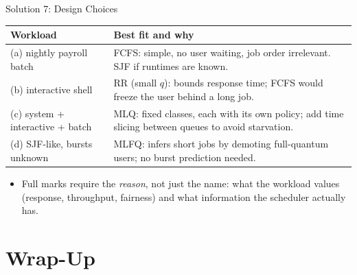 \documentclass[aspectratio=169]{beamer}
\begin{document}
\begin{frame}{Solution 7: Design Choices}
  \centering
  \footnotesize
  \renewcommand{\arraystretch}{1.35}
  \begin{tabular}{p{5.6cm}p{6.2cm}}
    \toprule
    \textbf{Workload} & \textbf{Best fit and why} \\
    \midrule
    (a) nightly payroll batch & FCFS: simple, no user waiting, job order
      irrelevant. SJF if runtimes are known. \\
    (b) interactive shell & RR (small $q$): bounds response time; FCFS would
      freeze the user behind a long job. \\
    (c) system + interactive + batch & MLQ: fixed classes, each with its own
      policy; add time slicing between queues to avoid starvation. \\
    (d) SJF-like, bursts unknown & MLFQ: infers short jobs by demoting
      full-quantum users; no burst prediction needed. \\
    \bottomrule
  \end{tabular}
  \vspace{0.25cm}
  \begin{itemize}
    \item Full marks require the \emph{reason}, not just the name: what the
      workload values (response, throughput, fairness) and what information
      the scheduler actually has.
  \end{itemize}
\end{frame}

\section{Wrap-Up}
\end{document}
